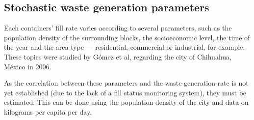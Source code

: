 \subsection{Stochastic waste generation parameters}
\label{section:parameters}

Each containers' fill rate varies according to several parameters, such as the
population density of the surrounding blocks, the socioeconomic level, the time
of the year and the area type --- residential, commercial or industrial, for
example. These topics were studied by Gómez et al, regarding the city of
Chihuahua, México in 2006\citep{Gomez20092018,Gomez20082465}.

As the correlation between these parameters and the waste generation rate is
not yet established (due to the lack of a fill status monitoring system), they
must be estimated. This can be done using the population density of the city
and data on kilograms per capita per day.






